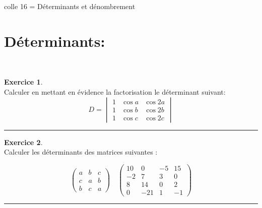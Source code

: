 \documentclass[a4paper,10pt]{article}
\theoremstyle{definition}
\theoremstyle{definition}
\newtheorem{exo}{Exercice}
\begin{document}
	
	
	\begin{center}
		\Large \sc colle 16 = Déterminants et dénombrement 
	\end{center}










\section*{Déterminants:}\hfill\\[-0.25cm]
\begin{minipage}{1\linewidth}
	\begin{minipage}[t]{0.48\linewidth}
		\raggedright
		
		
		
		\begin{exo}\quad\\
		Calculer en mettant en évidence la factorisation le déterminant suivant:
				$$ D = 
	\begin{vmatrix}
	1&\cos a& \cos 2a\\1&\cos b& \cos 2b\\1&\cos c& \cos 2c
	\end{vmatrix}
	$$
			
			\centering
			\rule{1\linewidth}{0.6pt}
		\end{exo}
		
		
		
		\begin{exo}\quad\\
			Calculer les déterminants des matrices suivantes :
			
			$$
			\begin{pmatrix}
			a&b&c\\c&a&b\\b&c&a
			\end{pmatrix}
			\quad
			\begin{pmatrix}
			10 & 0 & -5 & 15 \\ -2 & 7 & 3 & 0 \\ 8 & 14 & 0 & 2 \\ 0 & -21 & 1 & -1
			\end{pmatrix}
			$$
			\centering
			\rule{1\linewidth}{0.6pt}
		\end{exo}
	

\end{minipage}
\end{minipage}
\end{document}
